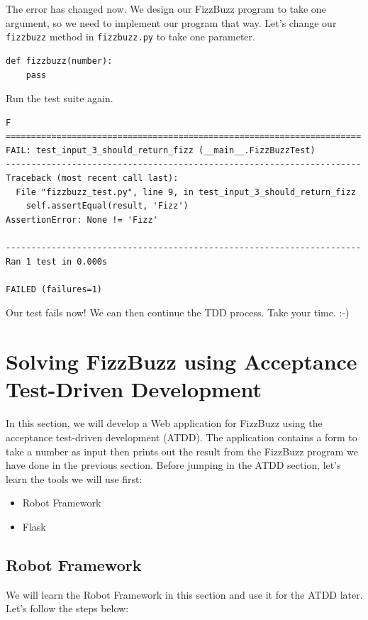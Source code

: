 \documentclass{article}
\begin{document}
\noindent The error has changed now. We design our FizzBuzz program to take one
argument, so we need to implement our program that way. Let's change our {\tt
fizzbuzz} method in {\tt fizzbuzz.py} to take one parameter.

\begin{verbatim}
def fizzbuzz(number):
    pass
\end{verbatim}

\noindent Run the test suite again.

\begin{verbatim}
F
======================================================================
FAIL: test_input_3_should_return_fizz (__main__.FizzBuzzTest)
----------------------------------------------------------------------
Traceback (most recent call last):
  File "fizzbuzz_test.py", line 9, in test_input_3_should_return_fizz
    self.assertEqual(result, 'Fizz')
AssertionError: None != 'Fizz'

----------------------------------------------------------------------
Ran 1 test in 0.000s

FAILED (failures=1)
\end{verbatim}

\noindent Our test fails now! We can then continue the TDD process. Take your
time. :-)

\section*{Solving FizzBuzz using Acceptance Test-Driven Development}

\noindent In this section, we will develop a Web application for FizzBuzz using
the acceptance test-driven development (ATDD). The application contains a form
to take a number as input then prints out the result from the FizzBuzz program
we have done in the previous section. Before jumping in the ATDD section, let's
learn the tools we will use first:

\begin{itemize}
  \item Robot Framework
  \item Flask
\end{itemize}

\subsection*{Robot Framework}

\noindent We will learn the Robot Framework in this section and use it for the
ATDD later. Let's follow the steps below:
\end{document}
